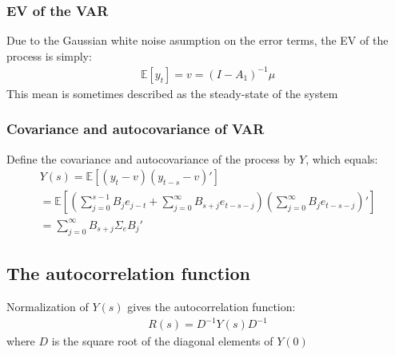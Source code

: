 \documentclass[10pt]{article}
\begin{document}
\subsubsection{EV of the VAR}
Due to the Gaussian white noise asumption on the error terms, the EV of the process is simply: 
\begin{gather*}
    \mathbb{E}[y_t] = v = (I - A_1)^{-1}\mu 
\end{gather*}
This mean is sometimes described as the steady-state of the system 
\newpage 
\subsubsection{Covariance and autocovariance of VAR}
Define the covariance and autocovariance of the process by $Y $, which equals: 
\begin{gather*}
    Y(s) = \mathbb{E}[(y_t - v)(y_{t - s} - v)']\\
    = \mathbb{E}\left[\left(\sum_{j = 0}^{s - 1}B_je_{j - t} + \sum_{j = 0}^{\infty}B_{s + j}e_{t - s - j}\right)\left(\sum_{j = 0}^{\infty}B_je_{t - s - j}\right)'\right]\\
    = \sum_{j = 0}^{\infty}B_{s + j}\Sigma_eB_j'
\end{gather*}
\subsection{The autocorrelation function}
Normalization of $Y(s) $ gives the autocorrelation function: 
\begin{gather*}
    R(s) = D^{-1}Y(s)D^{-1}
\end{gather*}
where $D $ is the square root of the diagonal elements of $Y(0) $
\end{document}
